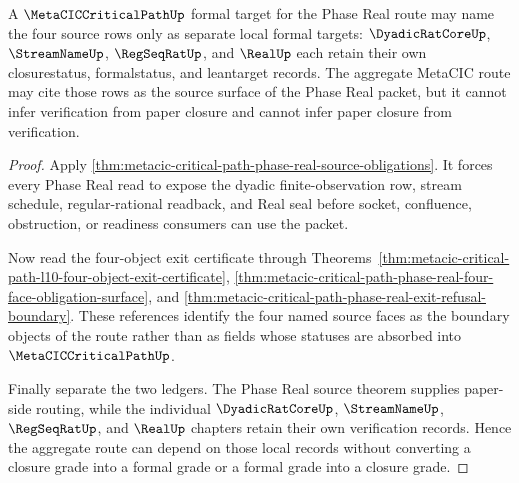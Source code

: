 \begin{theorem}
\label{thm:metacic-critical-path-formal-target-surface}
A $\MetaCICCriticalPathUp$ formal target for the Phase Real route may name the four source rows only as separate local formal targets: $\DyadicRatCoreUp$, $\StreamNameUp$, $\RegSeqRatUp$, and $\RealUp$ each retain their own closurestatus, formalstatus, and leantarget records. The aggregate MetaCIC route may cite those rows as the source surface of the Phase Real packet, but it cannot infer verification from paper closure and cannot infer paper closure from verification.
\end{theorem}
\begin{proof}
Apply \autoref{thm:metacic-critical-path-phase-real-source-obligations}. It forces every Phase Real read to expose the dyadic finite-observation row, stream schedule, regular-rational readback, and Real seal before socket, confluence, obstruction, or readiness consumers can use the packet.

Now read the four-object exit certificate through Theorems~\ref{thm:metacic-critical-path-l10-four-object-exit-certificate}, \ref{thm:metacic-critical-path-phase-real-four-face-obligation-surface}, and \ref{thm:metacic-critical-path-phase-real-exit-refusal-boundary}. These references identify the four named source faces as the boundary objects of the route rather than as fields whose statuses are absorbed into $\MetaCICCriticalPathUp$.

Finally separate the two ledgers. The Phase Real source theorem supplies paper-side routing, while the individual $\DyadicRatCoreUp$, $\StreamNameUp$, $\RegSeqRatUp$, and $\RealUp$ chapters retain their own verification records. Hence the aggregate route can depend on those local records without converting a closure grade into a formal grade or a formal grade into a closure grade.
\end{proof}
